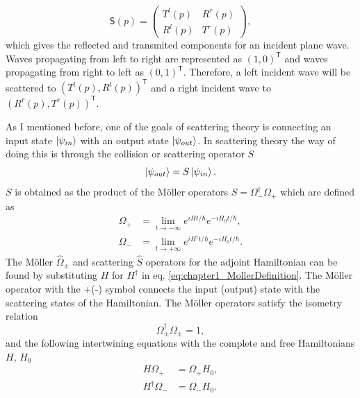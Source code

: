 %
\begin{equation}
  \mathsf{S}(p) =
  \left(
  \begin{array}{cc}
    T^l(p)&R^r(p)
    \\
    R^l(p)&T^r(p)
  \end{array}
  \right),
  \label{eq:chapter1_onShellMatrix}
\end{equation}
%
which gives the reflected and transmited components for an incident plane wave. Waves propagating from left to right are represented as $\left(1,0\right)^\mathsf{T}$ and waves propagating from right to left as $\left(0,1\right)^\mathsf{T}$. Therefore, a left incident wave will be scattered to $\left(T^l(p),R^l(p)\right)^\mathsf{T}$ and a right incident wave to $\left(R^r(p),T^r(p)\right)^\mathsf{T}$.

As I mentioned before, one of the goals of scattering theory is connecting an input state $\ket{\psi_{in}}$ with an output state $\ket{\psi_{out}}$. In scattering theory the way of doing this is through the collision or scattering operator $S$
%
\begin{equation}
  \ket{\psi_{out}} = S \ket{\psi_{in}}
  \label{eq:chapter1_actuationOfSOperator}.
\end{equation}
%
$S$ is obtained as the product of the M\"{o}ller operators $S = \Omega_{-}^\dagger\Omega_{+}$ which are defined as
%
\begin{align}
    \Omega_+ &= \lim_{t \to -\infty}e^{i H t / \hbar}e^{-i H_0 t/ \hbar},\nonumber\\
    \Omega_- &= \lim_{t \to +\infty}e^{i H^\dagger t/ \hbar}e^{-i H_0 t/ \hbar}.
    \label{eq:chapter1_MollerDefinition}
\end{align}
%
The M\"{o}ller $\widehat{\Omega}_\pm$ and scattering $\widehat{S}$ operators for the adjoint Hamiltonian can be found by substituting $H$ for $H^\dagger$ in eq. \eqref{eq:chapter1_MollerDefinition}. The M\"{o}ller operator with the +(-) symbol connects the input (output) state with the scattering states of the Hamiltonian. The M\"{o}ller operators satisfy the isometry relation
%
\begin{equation}
  \Omega_\pm^\dagger \Omega_\pm = 1,
  \label{eq:chapter1_MollerIsometry}
\end{equation}
%
and the following intertwining equations with the complete and free Hamiltonians $H$, $H_0$
%
\begin{align}
  H\Omega_+ &= \Omega_+ H_0,\nonumber
  \\
  H^\dagger\Omega_- &= \Omega_- H_0.
  \label{eq:chapter1_MollerIntertwining}
\end{align}
